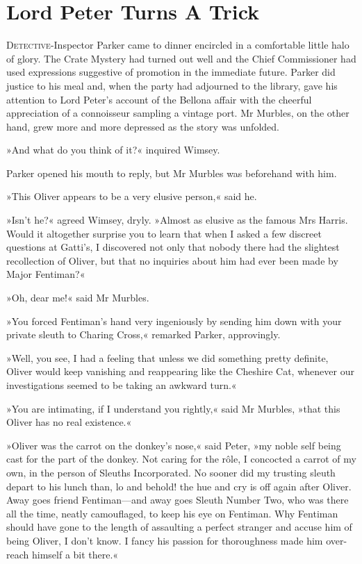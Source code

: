 \chapter{Lord Peter Turns A Trick}
\lettrine[lines=4]{D}{etective}-Inspector Parker came to dinner encircled in a comfortable little halo of glory. The Crate Mystery had turned out well and the Chief Commissioner had used expressions suggestive of promotion in the immediate future. Parker did justice to his meal and, when the party had adjourned to the library, gave his attention to Lord Peter's account of the Bellona affair with the cheerful appreciation of a connoisseur sampling a vintage port. Mr Murbles, on the other hand, grew more and more depressed as the story was unfolded.

»And what do you think of it?« inquired Wimsey.

Parker opened his mouth to reply, but Mr Murbles was beforehand with him.

»This Oliver appears to be a very elusive person,« said he.

»Isn't he?« agreed Wimsey, dryly. »Almost as elusive as the famous Mrs Harris. Would it altogether surprise you to learn that when I asked a few discreet questions at Gatti's, I discovered not only that nobody there had the slightest recollection of Oliver, but that no inquiries about him had ever been made by Major Fentiman?«

»Oh, dear me!« said Mr Murbles.

»You forced Fentiman's hand very ingeniously by sending him down with your private sleuth to Charing Cross,« remarked Parker, approvingly.

»Well, you see, I had a feeling that unless we did something pretty definite, Oliver would keep vanishing and reappearing like the Cheshire Cat, whenever our investigations seemed to be taking an awkward turn.«

»You are intimating, if I understand you rightly,« said Mr Murbles, »that this Oliver has no real existence.«

»Oliver was the carrot on the donkey's nose,« said Peter, »my noble self being cast for the part of the donkey. Not caring for the rôle, I concocted a carrot of my own, in the person of Sleuths Incorporated. No sooner did my trusting sleuth depart to his lunch than, lo and behold! the hue and cry is off again after Oliver. Away goes friend Fentiman\allowbreak---\allowbreak and away goes Sleuth Number Two, who was there all the time, neatly camouflaged, to keep his eye on Fentiman. Why Fentiman should have gone to the length of assaulting a perfect stranger and accuse him of being Oliver, I don't know. I fancy his passion for thoroughness made him over-reach himself a bit there.«

